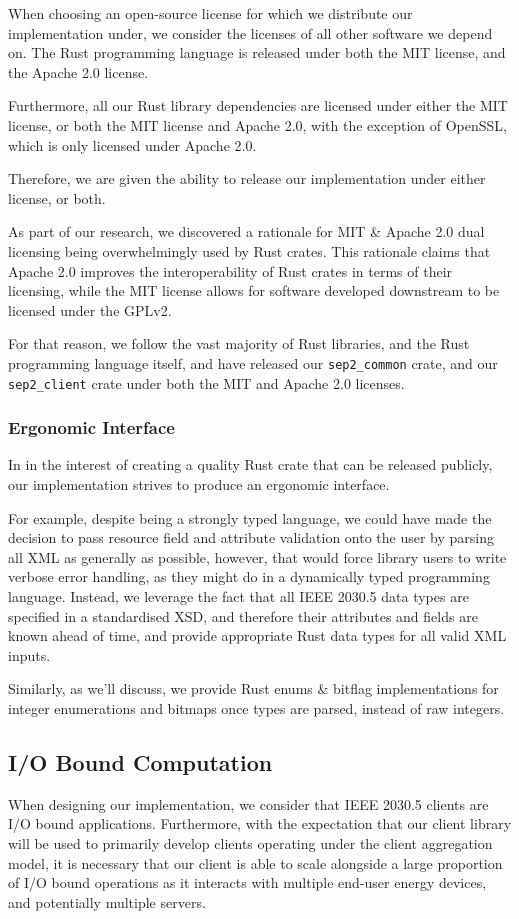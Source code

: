 When choosing an open-source license for which we distribute our implementation under, we consider the licenses of all other software we depend on. The Rust programming language is released under both the MIT license, and the Apache 2.0 license. 

Furthermore, all our Rust library dependencies are licensed under either the MIT license, or both the MIT license and Apache 2.0, with the exception of OpenSSL, which is only licensed under Apache 2.0.

Therefore, we are given the ability to release our implementation under either license, or both. 

As part of our research, we discovered a rationale for MIT \& Apache 2.0 dual licensing being overwhelmingly used by Rust crates. This rationale claims that Apache 2.0 improves the interoperability of Rust crates in terms of their licensing, while the MIT license allows for software developed downstream to be licensed under the GPLv2.
\cite{relicense} \cite{relicensejosh}

For that reason, we follow the vast majority of Rust libraries, and the Rust programming language itself, and have released our \texttt{sep2\_common} crate, and our \texttt{sep2\_client} crate under both the MIT and Apache 2.0 licenses.

\subsubsection{Ergonomic Interface}

In in the interest of creating a quality Rust crate that can be released publicly, our implementation strives to produce an ergonomic interface. 

For example, despite being a strongly typed language, we could have made the decision to pass resource field and attribute validation onto the user by parsing all XML as generally as possible, however, that would force library users to write verbose error handling, as they might do in a dynamically typed programming language. Instead, we leverage the fact that all IEEE 2030.5 data types are specified in a standardised XSD, and therefore their attributes and fields are known ahead of time, and provide appropriate Rust data types for all valid XML inputs.

Similarly, as we'll discuss, we provide Rust enums \& bitflag implementations for integer enumerations and bitmaps once types are parsed, instead of raw integers.

\subsection{I/O Bound Computation}
When designing our implementation, we consider that IEEE 2030.5 clients are I/O bound applications. Furthermore, with the expectation that our client library will be used to primarily develop clients operating under the client aggregation model, it is necessary that our client is able to scale alongside a large proportion of I/O bound operations as it interacts with multiple end-user energy devices, and potentially multiple servers.

